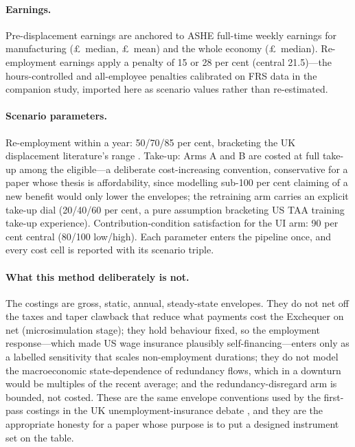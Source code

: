 \paragraph{Earnings.} Pre-displacement earnings are anchored to ASHE
full-time weekly earnings for manufacturing
(\pounds\TaaMedianWeeklyManuf\ median, \pounds\TaaMeanWeeklyManuf\ mean)
and the whole economy (\pounds\TaaMedianWeeklyAll\ median). Re-employment earnings apply a penalty of
15 or 28 per cent (central 21.5)---the hours-controlled and
all-employee penalties calibrated on FRS data in the companion study,
imported here as scenario values rather than re-estimated.

\paragraph{Scenario parameters.} Re-employment within a year:
50/70/85 per cent, bracketing the UK
displacement literature's range \citep{hijzen2010, upwardwright2019}.
Take-up: Arms A and B are costed at full take-up among the eligible---a
deliberate cost-increasing convention, conservative for a paper whose
thesis is affordability, since modelling sub-100 per cent claiming of a
new benefit would only lower the envelopes; the retraining arm carries an
explicit take-up dial (20/40/60 per cent, a pure assumption bracketing US
TAA training take-up experience).
Contribution-condition satisfaction for the UI arm: 90 per cent central
(80/100 low/high). Each parameter enters the
pipeline once, and every cost cell is reported with its scenario triple.

\paragraph{What this method deliberately is not.} The costings are gross,
static, annual, steady-state envelopes. They do not net off the taxes and
taper clawback that reduce what payments cost the Exchequer on net
(microsimulation stage); they hold behaviour fixed, so the
\citet{hyman2024} employment response---which made US wage insurance
plausibly self-financing---enters only as a labelled sensitivity that
scales non-employment durations; they do not model the macroeconomic
state-dependence of redundancy flows, which in a downturn would be
multiples of the recent average; and the redundancy-disregard arm is
bounded, not costed. These are the same envelope conventions used by the
first-pass costings in the UK unemployment-insurance debate
\citep{ifs2025ui}, and they are the appropriate honesty for a paper whose
purpose is to put a designed instrument set on the table.
